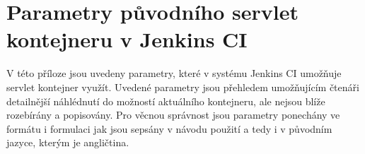 
\chapter{Parametry původního servlet kontejneru v Jenkins CI} \label{prilohaParametry}
    V této příloze jsou  uvedeny parametry, které v systému Jenkins CI umožňuje
    servlet kontejner využít. Uvedené parametry jsou přehledem umožňujícím čtenáři
    detailnější náhlédnutí do možností aktuálního kontejneru, ale 
    nejsou blíže rozebírány a popisovány. Pro věcnou správnost 
    jsou parametry ponechány ve formátu i formulaci jak jsou 
    sepsány v návodu použití a tedy i v původním jazyce, kterým je angličtina.

